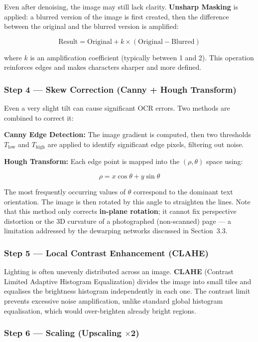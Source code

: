 \documentclass[12pt, a4paper]{article}
\begin{document}
Even after denoising, the image may still lack clarity. \textbf{Unsharp Masking} is applied: a blurred version of the image is first created, then the difference between the original and the blurred version is amplified:

\[
\text{Result} = \text{Original} + k \times (\text{Original} - \text{Blurred})
\]

where $k$ is an amplification coefficient (typically between 1 and 2). This operation reinforces edges and makes characters sharper and more defined.

\subsubsection*{Step 4 --- Skew Correction (Canny + Hough Transform)}

Even a very slight tilt can cause significant OCR errors. Two methods are combined to correct it:

\textbf{Canny Edge Detection:} The image gradient is computed, then two thresholds $T_{\text{low}}$ and $T_{\text{high}}$ are applied to identify significant edge pixels, filtering out noise.

\textbf{Hough Transform:} Each edge point is mapped into the $(\rho, \theta)$ space using:

\[
\rho = x \cos\theta + y \sin\theta
\]

The most frequently occurring values of $\theta$ correspond to the dominant text orientation. The image is then rotated by this angle to straighten the lines. Note that this method only corrects \textbf{in-plane rotation}; it cannot fix perspective distortion or the 3D curvature of a photographed (non-scanned) page --- a limitation addressed by the dewarping networks discussed in Section~3.3.

\subsubsection*{Step 5 --- Local Contrast Enhancement (CLAHE)}

Lighting is often unevenly distributed across an image. \textbf{CLAHE} (Contrast Limited Adaptive Histogram Equalization) divides the image into small tiles and equalises the brightness histogram independently in each one. The contrast limit prevents excessive noise amplification, unlike standard global histogram equalisation, which would over-brighten already bright regions.

\subsubsection*{Step 6 --- Scaling (Upscaling $\times$2)}
\end{document}
